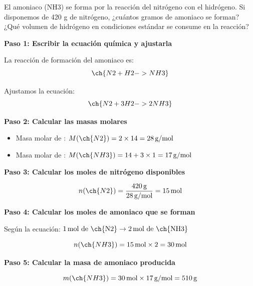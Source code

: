 \begin{exercise}
    El amoniaco (NH3) se forma por la reacción del nitrógeno con el hidrógeno.
    Si
    disponemos de 420 g de nitrógeno, ¿cuántos gramos de amoniaco se forman? ¿Qué volumen de
    hidrógeno en condiciones estándar se consume en la reacción?
    \begin{solu}
        \textbf{Paso 1: Escribir la ecuación química y ajustarla}

        La reacción de formación del amoniaco es:
        \begin{equation*}
            \ch{N2 + H2 -> NH3}
        \end{equation*}

        Ajustamos la ecuación:
        \begin{equation*}
            \ch{N2 + 3 H2 -> 2 NH3}
        \end{equation*}

        \textbf{Paso 2: Calcular las masas molares}

        \begin{itemize}
            \item Masa molar de : $M(\ch{N2}) = 2 \times 14 = 28\,\text{g/mol}$
            \item Masa molar de : $M(\ch{NH3}) = 14 + 3 \times 1 = 17\,\text{g/mol}$
        \end{itemize}

        \textbf{Paso 3: Calcular los moles de nitrógeno disponibles}

        \begin{equation*}
            n(\ch{N2}) = \frac{420\,\text{g}}{28\,\text{g/mol}} = 15\,\text{mol}
        \end{equation*}

        \textbf{Paso 4: Calcular los moles de amoniaco que se forman}

        Según la ecuación: $1\,\text{mol de \ch{N2}} \rightarrow 2\,\text{mol de \ch{NH3}}$

        \begin{equation*}
            n(\ch{NH3}) = 15\,\text{mol} \times 2 = 30\,\text{mol}
        \end{equation*}

        \textbf{Paso 5: Calcular la masa de amoniaco producida}

        \begin{equation*}
            m(\ch{NH3}) = 30\,\text{mol} \times 17\,\text{g/mol} = 510\,\text{g}
        \end{equation*}


\end{solu}
\end{exercise}
